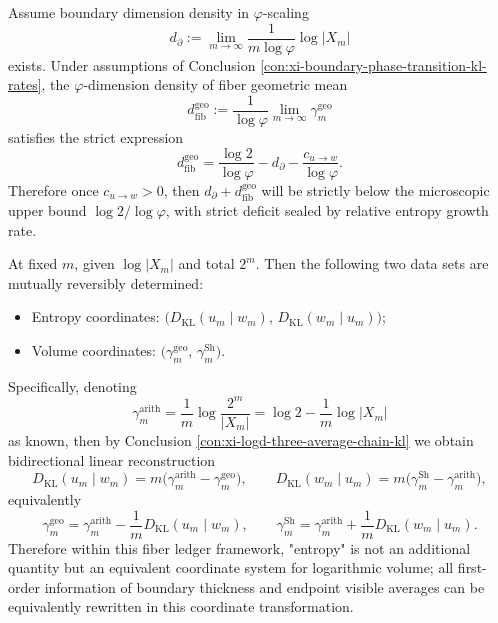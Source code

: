 \begin{conclusion}\label{con:xi-fractal-dimension-entropy-deficit}
Assume boundary dimension density in \(\varphi\)-scaling
\[
d_\partial:=\lim_{m\to\infty}\frac{1}{m\log\varphi}\log|X_m|
\]
exists.
Under assumptions of Conclusion \ref{con:xi-boundary-phase-transition-kl-rates}, the \(\varphi\)-dimension density of fiber geometric mean
\[
d_{\mathrm{fib}}^{\mathrm{geo}}
:=\frac{1}{\log\varphi}\lim_{m\to\infty}\gamma_m^{\mathrm{geo}}
\]
satisfies the strict expression
\[
d_{\mathrm{fib}}^{\mathrm{geo}}=\frac{\log 2}{\log\varphi}-d_\partial-\frac{c_{u\to w}}{\log\varphi}.
\]
Therefore once \(c_{u\to w}>0\), then \(d_\partial+d_{\mathrm{fib}}^{\mathrm{geo}}\) will be strictly below the microscopic upper bound \(\log 2/\log\varphi\), with strict deficit sealed by relative entropy growth rate.
\end{conclusion}

\begin{conclusion}\label{con:xi-entropy-volume-dual-coordinates}
At fixed \(m\), given \(\log|X_m|\) and total \(2^m\).
Then the following two data sets are mutually reversibly determined:
\begin{itemize}
  \item Entropy coordinates: \(\bigl(D_{\mathrm{KL}}(u_m\mid w_m),\,D_{\mathrm{KL}}(w_m\mid u_m)\bigr)\);
  \item Volume coordinates: \(\bigl(\gamma_m^{\mathrm{geo}},\,\gamma_m^{\mathrm{Sh}}\bigr)\).
\end{itemize}
Specifically, denoting
\[
\gamma_m^{\mathrm{arith}}
=\frac{1}{m}\log\frac{2^m}{|X_m|}
=\log 2-\frac{1}{m}\log|X_m|
\]
as known, then by Conclusion \ref{con:xi-logd-three-average-chain-kl} we obtain bidirectional linear reconstruction
\[
D_{\mathrm{KL}}(u_m\mid w_m)=m\bigl(\gamma_m^{\mathrm{arith}}-\gamma_m^{\mathrm{geo}}\bigr),
\qquad
D_{\mathrm{KL}}(w_m\mid u_m)=m\bigl(\gamma_m^{\mathrm{Sh}}-\gamma_m^{\mathrm{arith}}\bigr),
\]
equivalently
\[
\gamma_m^{\mathrm{geo}}=\gamma_m^{\mathrm{arith}}-\frac{1}{m}D_{\mathrm{KL}}(u_m\mid w_m),
\qquad
\gamma_m^{\mathrm{Sh}}=\gamma_m^{\mathrm{arith}}+\frac{1}{m}D_{\mathrm{KL}}(w_m\mid u_m).
\]
Therefore within this fiber ledger framework, "entropy" is not an additional quantity but an equivalent coordinate system for logarithmic volume; all first-order information of boundary thickness and endpoint visible averages can be equivalently rewritten in this coordinate transformation.
\end{conclusion}


